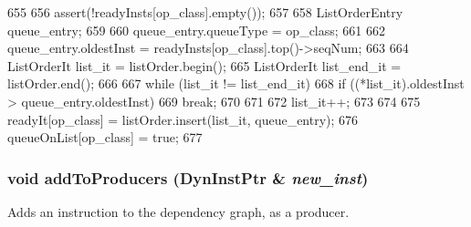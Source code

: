 \begin{DoxyCode}
655 {
656     assert(!readyInsts[op_class].empty());
657 
658     ListOrderEntry queue_entry;
659 
660     queue_entry.queueType = op_class;
661 
662     queue_entry.oldestInst = readyInsts[op_class].top()->seqNum;
663 
664     ListOrderIt list_it = listOrder.begin();
665     ListOrderIt list_end_it = listOrder.end();
666 
667     while (list_it != list_end_it) {
668         if ((*list_it).oldestInst > queue_entry.oldestInst) {
669             break;
670         }
671 
672         list_it++;
673     }
674 
675     readyIt[op_class] = listOrder.insert(list_it, queue_entry);
676     queueOnList[op_class] = true;
677 }
\end{DoxyCode}
\hypertarget{classInstructionQueue_af89be5ea301621fdfb44941b4db60339}{
\subsubsection[{addToProducers}]{\setlength{\rightskip}{0pt plus 5cm}void addToProducers ({\bf DynInstPtr} \& {\em new\_\-inst})}}
\label{classInstructionQueue_af89be5ea301621fdfb44941b4db60339}
Adds an instruction to the dependency graph, as a producer. 


